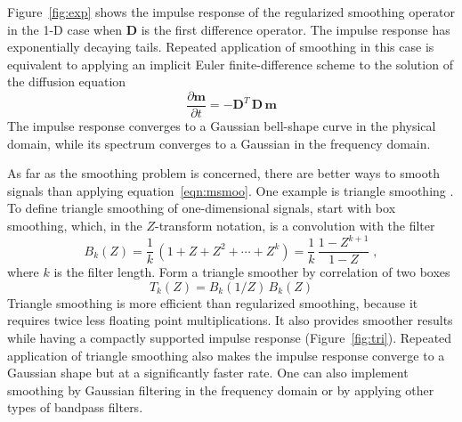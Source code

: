 Figure~\ref{fig:exp} shows the impulse response of the regularized
smoothing operator in the 1-D case when $\mathbf{D}$ is %
the first difference operator. The impulse response has exponentially
decaying tails. Repeated application of smoothing in this case is
equivalent to applying an implicit Euler finite-difference scheme to
the solution of the diffusion equation
\begin{equation}
  \label{eq:diff}
  \frac{\partial \mathbf{m}}{\partial t} = 
  -\mathbf{D}^T\,\mathbf{D}\,\mathbf{m}
\end{equation}
The impulse response converges to a Gaussian bell-shape curve in the physical
domain, while its spectrum converges to a Gaussian in the frequency domain.


As far as the smoothing problem is concerned, there are better ways to
smooth signals than applying
equation~\ref{eqn:msmoo}. One example is triangle
smoothing \cite[]{Claerbout.blackwell.92}. To define triangle
smoothing of one-dimensional signals, start with box smoothing, which,
in the $Z$-transform notation, is a convolution with the filter
\begin{equation}
  \label{eq:zbox}
  B_k(Z) = \frac{1}{k}\,\left(1 + Z + Z^2 + \cdots +  Z^k\right) = 
  \frac{1}{k}\,\frac{1-Z^{k+1}}{1-Z}\;,
\end{equation}
where $k$ is the filter length. Form a triangle smoother by
correlation of two boxes
\begin{equation}
  \label{eq:ztri}
  T_k(Z) = B_k(1/Z)\,B_k(Z) 
\end{equation}
Triangle smoothing is more
efficient than regularized smoothing, because it requires twice less
floating point multiplications. It also provides smoother results
while having a compactly supported impulse response
(Figure~\ref{fig:tri}). Repeated application of triangle smoothing
also makes the impulse response converge to a Gaussian shape but at a
significantly faster rate.
One can also implement smoothing by Gaussian filtering in the frequency domain
or by applying other types of bandpass filters. 


